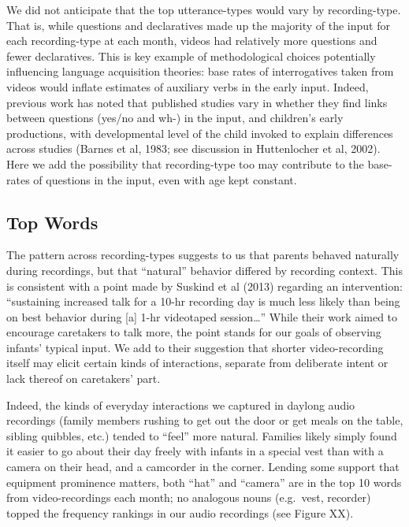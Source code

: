 \documentclass[floatsintext,man]{apa6}
\theoremstyle{definition}
\theoremstyle{definition}
\theoremstyle{definition}
\theoremstyle{remark}
\begin{document}
We did not anticipate that the top utterance-types would vary by
recording-type. That is, while questions and declaratives made up the
majority of the input for each recording-type at each month, videos had
relatively more questions and fewer declaratives. This is key example of
methodological choices potentially influencing language acquisition
theories: base rates of interrogatives taken from videos would inflate
estimates of auxiliary verbs in the early input. Indeed, previous work
has noted that published studies vary in whether they find links between
questions (yes/no and wh-) in the input, and children's early
productions, with developmental level of the child invoked to explain
differences across studies (Barnes et al, 1983; see discussion in
Huttenlocher et al, 2002). Here we add the possibility that
recording-type too may contribute to the base-rates of questions in the
input, even with age kept constant.

\subsection{Top Words}\label{top-words}

The pattern across recording-types suggests to us that parents behaved
naturally during recordings, but that \enquote{natural} behavior
differed by recording context. This is consistent with a point made by
Suskind et al (2013) regarding an intervention: \enquote{sustaining
increased talk for a 10-hr recording day is much less likely than being
on best behavior during {[}a{]} 1-hr videotaped session\ldots{}} While
their work aimed to encourage caretakers to talk more, the point stands
for our goals of observing infants' typical input. We add to their
suggestion that shorter video-recording itself may elicit certain kinds
of interactions, separate from deliberate intent or lack thereof on
caretakers' part.

Indeed, the kinds of everyday interactions we captured in daylong audio
recordings (family members rushing to get out the door or get meals on
the table, sibling quibbles, etc.) tended to \enquote{feel} more
natural. Families likely simply found it easier to go about their day
freely with infants in a special vest than with a camera on their head,
and a camcorder in the corner. Lending some support that equipment
prominence matters, both \enquote{hat} and \enquote{camera} are in the
top 10 words from video-recordings each month; no analogous nouns
(e.g.~vest, recorder) topped the frequency rankings in our audio
recordings (see Figure XX).
\end{document}
